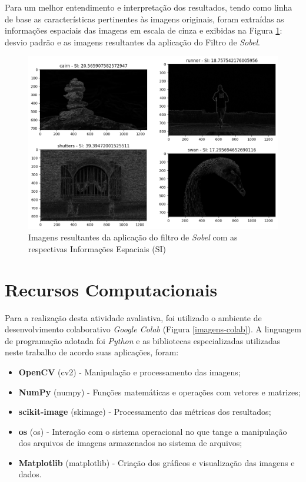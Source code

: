 Para um melhor entendimento e interpretação dos resultados, tendo como linha de base as características pertinentes às imagens originais, foram extraídas as informações espaciais das imagens em escala de cinza e exibidas na Figura \ref{imagens-si}: desvio padrão e as imagens resultantes da aplicação do Filtro de \textit{Sobel}.

\begin{figure}[!htpb]
 \centering
 \includegraphics[scale=0.5]{Elementos/Figuras/metodologia-si.png}
 \caption{Imagens resultantes da aplicação do filtro de \textit{Sobel} com as respectivas Informações Espaciais (SI)}
 \label{imagens-si}
\end{figure}

\section{Recursos Computacionais}
\label{sec:recursos}

Para a realização desta atividade avaliativa, foi utilizado o ambiente de desenvolvimento colaborativo \textit{Google Colab} (Figura \ref{imagens-colab}). A linguagem de programação adotada foi \textit{Python} e as bibliotecas especializadas utilizadas neste trabalho de acordo suas aplicações, foram:

\begin{itemize}
    \item \textbf{OpenCV} (cv2) - Manipulação e processamento das imagens;
    \item \textbf{NumPy} (numpy) - Funções matemáticas e operações com vetores e matrizes;
    \item \textbf{scikit-image} (skimage) - Processamento das métricas dos resultados;
    \item \textbf{os} (os) - Interação com o sistema operacional no que tange a manipulação dos arquivos de imagens armazenados no sistema de arquivos;
    \item \textbf{Matplotlib} (matplotlib) - Criação dos gráficos e visualização das imagens e dados.
\end{itemize}



